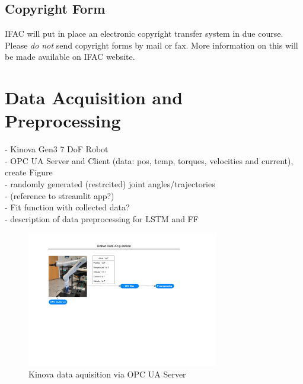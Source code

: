 \documentclass{ifacconf}
\begin{document}
\subsection{Copyright Form}

IFAC will put in place an electronic copyright transfer system in due
course. Please \emph{do not} send copyright forms by mail or fax. More
information on this will be made available on IFAC website.

\section{Data Acquisition and Preprocessing}
- Kinova Gen3 7 DoF Robot \\
- OPC UA Server and Client (data: pos, temp, torques, velocities and current), create Figure\\
- randomly generated (restrcited) joint angles/trajectories \\
- (reference to streamlit app?)\\
- Fit function with collected data? \\
- description of data preprocessing for LSTM and FF

\begin{figure}
  \begin{center}
  \includegraphics[width=8.4cm]{pictures/DataAquisition.pdf}    %
  \caption{Kinova data aquisition via OPC UA Server} 
  \label{fig:DataAquisition}
  \end{center}
  \end{figure}


\end{document}
